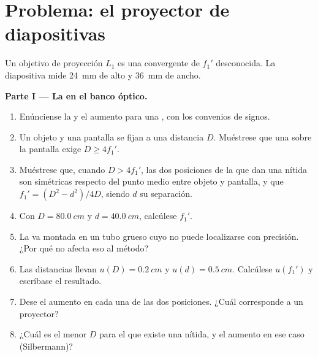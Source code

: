 \section{Problema: el proyector de diapositivas}

\begin{problem}
\label{pb:b1:mirrors-thin-lenses:1}
Un objetivo de proyección $L_1$ es una  convergente de
 $f_1'$ desconocida. La diapositiva mide \qty{24}{mm} de
alto y \qty{36}{mm} de ancho.

\medskip
\noindent\textbf{Parte I --- La  en el banco óptico.}
\begin{enumerate}
  \item Enúnciense la  y el aumento para una , con los convenios de signos.
  \item Un objeto y una pantalla se fijan a una distancia $D$. Muéstrese
        que una  sobre la pantalla exige $D \geq 4f_1'$.
  \item Muéstrese que, cuando $D > 4f_1'$, las dos posiciones de la 
        que dan una  nítida son simétricas respecto del punto medio
        entre objeto y pantalla, y que $f_1' = (D^2 - d^2)/4D$, siendo $d$
        su separación.
  \item Con $D = \qty{80.0}{cm}$ y $d = \qty{40.0}{cm}$, calcúlese
        $f_1'$.
  \item La  va montada en un tubo grueso cuyo  no puede
        localizarse con precisión. ¿Por qué no afecta eso al método?
  \item Las distancias llevan $u(D) = \qty{0.2}{cm}$ y
        $u(d) = \qty{0.5}{cm}$. Calcúlese $u(f_1')$ y escríbase el resultado.
  \item Dese el aumento en cada una de las dos posiciones. ¿Cuál
        corresponde a un proyector?
  \item ¿Cuál es el menor $D$ para el que existe una  nítida, y el
        aumento en ese caso (Silbermann)?
\end{enumerate}


\end{problem}
